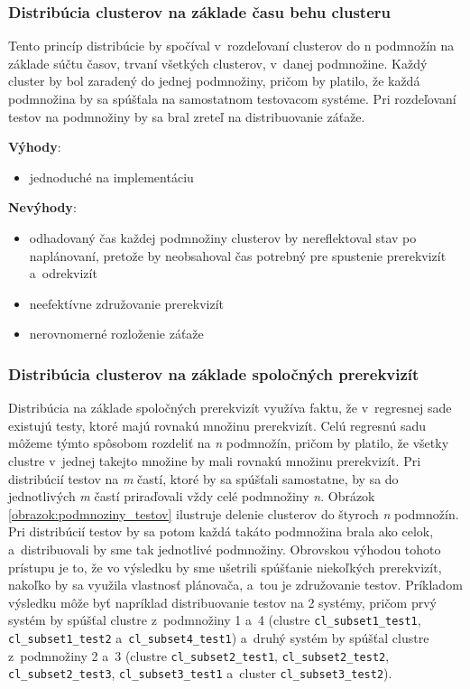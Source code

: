 \subsubsection*{Distribúcia clusterov na základe času behu clusteru}
Tento princíp distribúcie by spočíval v~rozdeľovaní clusterov do n podmnožín na základe súčtu časov, 
trvaní všetkých clusterov, v~danej podmnožine. Každý cluster by bol zaradený do jednej podmnožiny, pričom by platilo,
že každá podmnožina by sa spúšťala na samostatnom testovacom systéme. Pri rozdeľovaní testov na podmnožiny by sa bral zreteľ na
distribuovanie záťaže.

\noindent \textbf{Výhody}:
\begin{itemize}
\item jednoduché na implementáciu
\end{itemize} 

\noindent \textbf{Nevýhody}:
\begin{itemize}
\item odhadovaný čas každej podmnožiny clusterov by nereflektoval stav po naplánovaní, pretože by
neobsahoval čas potrebný pre spustenie prerekvizít a~odrekvizít
\item neefektívne združovanie prerekvizít
\item nerovnomerné rozloženie záťaže
\end{itemize}

\subsubsection*{Distribúcia clusterov na základe spoločných prerekvizít}
Distribúcia na základe spoločných prerekvizít využíva faktu, že v~regresnej sade existujú testy, ktoré majú rovnakú množinu prerekvizít.
Celú regresnú sadu môžeme týmto spôsobom rozdeliť na \emph{n} podmnožín, pričom by platilo, že všetky clustre v~jednej takejto množine by mali
rovnakú množinu prerekvizít. Pri distribúcií testov na \emph{m} častí, ktoré by sa spúšťali samostatne, by sa do jednotlivých \emph{m} častí
priraďovali vždy celé podmnožiny \emph{n}. Obrázok \ref{obrazok:podmnoziny_testov} ilustruje delenie clusterov do štyroch \emph{n} podmnožín.
Pri distribúcií testov by sa potom každá takáto podmnožina brala ako celok, a~distribuovali by sme tak jednotlivé podmnožiny.
Obrovskou výhodou tohoto prístupu je to, že vo výsledku by sme ušetrili spúšťanie niekoľkých prerekvizít, nakoľko by sa
využila vlastnosť plánovača, a~tou je združovanie testov. Príkladom výsledku môže byť napríklad distribuovanie testov na 2 systémy, 
pričom prvý systém by spúšťal clustre z~podmnožiny 1 a~4 (clustre \texttt{cl\_subset1\_test1}, \texttt{cl\_subset1\_test2} a~\texttt{cl\_subset4\_test1})
a~druhý systém by spúšťal clustre z~podmnožiny 2 a~3 (clustre \texttt{cl\_subset2\_test1}, \texttt{cl\_subset2\_test2}, 
\texttt{cl\_subset2\_test3}, \texttt{cl\_subset3\_test1} a~cluster \texttt{cl\_subset3\_test2}).

